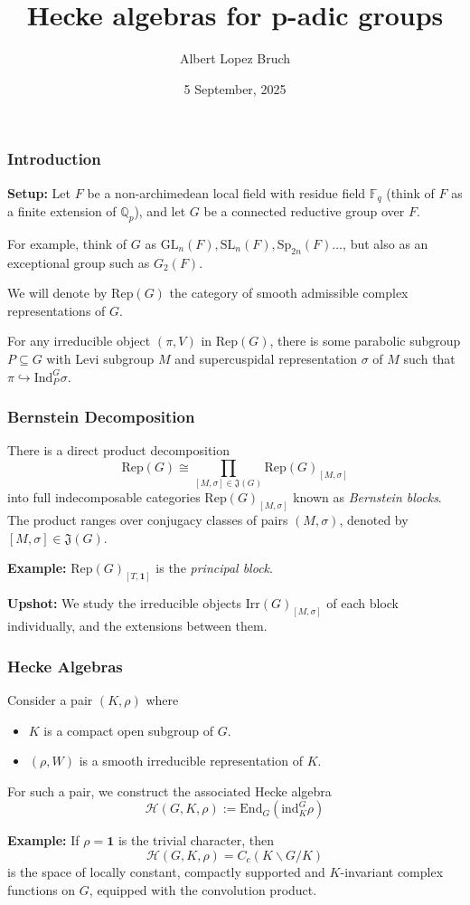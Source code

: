 \documentclass{beamer}
\title{Hecke algebras for p-adic groups}
\author{Albert Lopez Bruch}
\date{5 September, 2025}
\newcommand{\Rep}{\mathrm{Rep}}
\newcommand{\Irr}{\mathrm{Irr}}
\newcommand{\Ind}{\mathrm{Ind}}
\newcommand{\GL}{\mathrm{GL}}
\newcommand{\SL}{\mathrm{SL}}
\newcommand{\Sp}{\mathrm{Sp}}
\newcommand{\End}{\mathrm{End}}
\newcommand{\ind}{\mathrm{ind}}
\newcommand{\QQ}{\mathbb{Q}}
\newcommand{\cH}{\mathcal{H}}
\theoremstyle{plain}
\begin{document}
\frame{\titlepage}


\begin{frame}
    \frametitle{Introduction}
    \textbf{Setup:} Let $F$ be a non-archimedean local field with residue field $\mathbb{F}_q$ (think of $F$ as a finite extension of $\QQ_p$), and let $G$ be a connected reductive group over $F$.
    \vspace{0.3cm}

    For example, think of $G$ as $\GL_n(F), \SL_n(F), \Sp_{2n}(F)\ldots$, but also as an exceptional group such as $G_2(F)$.
    \vspace{0.3cm}

    We will denote by $\Rep(G)$ the category of smooth admissible complex representations of $G$.

    \begin{fact}
        For any irreducible object $(\pi,V)$ in $\Rep(G)$, there is some parabolic subgroup $P\subseteq G$ with Levi subgroup $M$ and supercuspidal representation $\sigma$ of $M$ such that $\pi\hookrightarrow\Ind_P^G\sigma$.
    \end{fact}
\end{frame}

\begin{frame}
    \frametitle{Bernstein Decomposition}
    \begin{theorem}[Bernstein]
        There is a direct product decomposition
        \[\Rep(G)\cong \prod_{[M,\sigma]\in\mathfrak{J}(G)}\Rep(G)_{[M,\sigma]}\]
        into full indecomposable categories $\Rep(G)_{[M,\sigma]}$ known as \textit{Bernstein blocks}. The product ranges over conjugacy classes of pairs $(M,\sigma)$, denoted by $[M,\sigma]\in\mathfrak{J}(G)$.
    \end{theorem}
    \textbf{Example:} $\Rep(G)_{[T,\mathbf{1}]}$ is the \textit{principal block}.
    \vspace{0.3cm}

    \textbf{Upshot:} We study the irreducible objects $\Irr(G)_{[M,\sigma]}$ of each block individually, and the extensions between them.
\end{frame}


\begin{frame}
    \frametitle{Hecke Algebras}
    Consider a pair $(K,\rho)$ where
    \begin{itemize}
        \item $K$ is a compact open subgroup of $G$.
        \item $(\rho,W)$ is a smooth irreducible representation of $K$.
    \end{itemize}
    For such a pair, we construct the associated Hecke algebra
    \[\cH(G,K,\rho):=\End_G(\ind_K^G\rho)\]

    \textbf{Example:} If $\rho=\textbf{1}$ is the trivial character, then 
    \[\cH(G,K,\rho)=C_c(K\backslash G/K)\]
    is the space of locally constant, compactly supported and $K$-invariant complex functions on $G$, equipped with the convolution product.
    
    
\end{frame}
\end{document}
